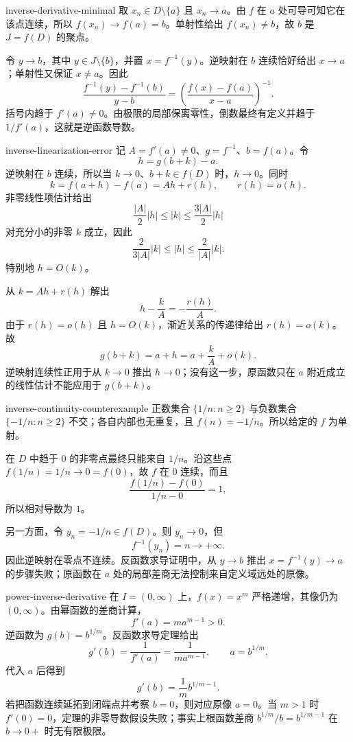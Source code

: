 \begin{solution}{inverse-derivative-minimal}
取 \(x_n\in D\setminus\{a\}\) 且 \(x_n\to a\)。由 \(f\) 在 \(a\) 处可导可知它在该点连续，所以 \(f(x_n)\to f(a)=b\)。单射性给出 \(f(x_n)\ne b\)，故 \(b\) 是 \(J=f(D)\) 的聚点。

令 \(y\to b\)，其中 \(y\in J\setminus\{b\}\)，并置 \(x=f^{-1}(y)\)。逆映射在 \(b\) 连续恰好给出 \(x\to a\)；单射性又保证 \(x\ne a\)。因此
\[
 \frac{f^{-1}(y)-f^{-1}(b)}{y-b}
 =\left(\frac{f(x)-f(a)}{x-a}\right)^{-1}.
\]
括号内趋于 \(f'(a)\ne0\)。由极限的局部保离零性，倒数最终有定义并趋于 \(1/f'(a)\)，这就是逆函数导数。
\end{solution}

\begin{solution}{inverse-linearization-error}
记 \(A=f'(a)\ne0\)、\(g=f^{-1}\)、\(b=f(a)\)。令
\[
 h=g(b+k)-a.
\]
逆映射在 \(b\) 连续，所以当 \(k\to0\)、\(b+k\in f(D)\) 时，\(h\to0\)。同时
\[
 k=f(a+h)-f(a)=Ah+r(h),\qquad r(h)=o(h).
\]
非零线性项估计给出
\[
 \frac{|A|}{2}|h|\le |k|\le\frac{3|A|}{2}|h|
\]
对充分小的非零 \(k\) 成立，因此
\[
 \frac{2}{3|A|}|k|\le |h|\le\frac{2}{|A|}|k|.
\]
特别地 \(h=O(k)\)。

从 \(k=Ah+r(h)\) 解出
\[
 h-\frac{k}{A}=-\frac{r(h)}A.
\]
由于 \(r(h)=o(h)\) 且 \(h=O(k)\)，渐近关系的传递律给出 \(r(h)=o(k)\)。故
\[
 g(b+k)=a+h=a+\frac{k}{A}+o(k).
\]
逆映射连续性正用于从 \(k\to0\) 推出 \(h\to0\)；没有这一步，原函数只在 \(a\) 附近成立的线性估计不能应用于 \(g(b+k)\)。
\end{solution}

\begin{solution}{inverse-continuity-counterexample}
正数集合 \(\{1/n:n\ge2\}\) 与负数集合 \(\{-1/n:n\ge2\}\) 不交；各自内部也无重复，且 \(f(n)=-1/n\)。所以给定的 \(f\) 为单射。

在 \(D\) 中趋于 \(0\) 的非零点最终只能来自 \(1/n\)。沿这些点 \(f(1/n)=1/n\to0=f(0)\)，故 \(f\) 在 \(0\) 连续，而且
\[
 \frac{f(1/n)-f(0)}{1/n-0}=1,
\]
所以相对导数为 \(1\)。

另一方面，令 \(y_n=-1/n\in f(D)\)。则 \(y_n\to0\)，但
\[
 f^{-1}(y_n)=n\to+\infty.
\]
因此逆映射在零点不连续。反函数求导证明中，从 \(y\to b\) 推出 \(x=f^{-1}(y)\to a\) 的步骤失败；原函数在 \(a\) 处的局部差商无法控制来自定义域远处的原像。
\end{solution}

\begin{solution}{power-inverse-derivative}
在 \(I=(0,\infty)\) 上，\(f(x)=x^m\) 严格递增，其像仍为 \((0,\infty)\)。由幂函数的差商计算，
\[
 f'(a)=ma^{m-1}>0.
\]
逆函数为 \(g(b)=b^{1/m}\)。反函数求导定理给出
\[
 g'(b)=\frac1{f'(a)}
 =\frac1{ma^{m-1}},
 \qquad a=b^{1/m}.
\]
代入 \(a\) 后得到
\[
 g'(b)=\frac1m b^{1/m-1}.
\]
若把函数连续延拓到闭端点并考察 \(b=0\)，则对应原像 \(a=0\)。当 \(m>1\) 时 \(f'(0)=0\)，定理的非零导数假设失败；事实上根函数差商 \(b^{1/m}/b=b^{1/m-1}\) 在 \(b\to0+\) 时无有限极限。
\end{solution}

